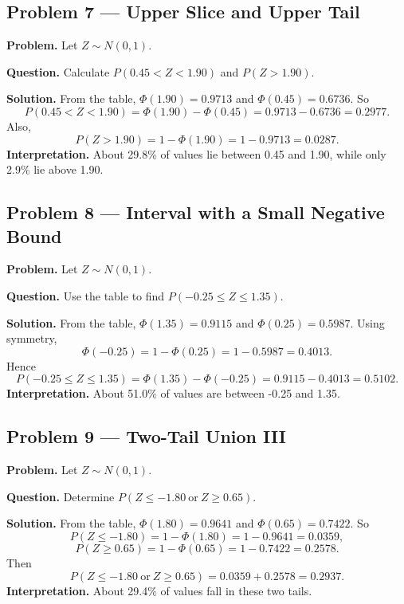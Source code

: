 \begin{ExamProblems}

\item
\subsection*{Problem 7 --- Upper Slice and Upper Tail}

\textbf{Problem.}
Let \(Z\sim N(0,1)\).

\textbf{Question.} Calculate \(P(0.45<Z<1.90)\) and \(P(Z>1.90)\).

\textbf{Solution.}
From the table, \(\Phi(1.90)=0.9713\) and \(\Phi(0.45)=0.6736\).
So
\[
P(0.45<Z<1.90)=\Phi(1.90)-\Phi(0.45)=0.9713-0.6736=0.2977.
\]
Also,
\[
P(Z>1.90)=1-\Phi(1.90)=1-0.9713=0.0287.
\]
\textbf{Interpretation.} About 29.8\% of values lie between 0.45 and 1.90, while only 2.9\% lie above 1.90.


\item
\subsection*{Problem 8 --- Interval with a Small Negative Bound}

\textbf{Problem.}
Let \(Z\sim N(0,1)\).

\textbf{Question.} Use the table to find \(P(-0.25\le Z\le 1.35)\).

\textbf{Solution.}
From the table, \(\Phi(1.35)=0.9115\) and \(\Phi(0.25)=0.5987\).
Using symmetry,
\[
\Phi(-0.25)=1-\Phi(0.25)=1-0.5987=0.4013.
\]
Hence
\[
P(-0.25\le Z\le 1.35)=\Phi(1.35)-\Phi(-0.25)=0.9115-0.4013=0.5102.
\]
\textbf{Interpretation.} About 51.0\% of values are between -0.25 and 1.35.


\item
\subsection*{Problem 9 --- Two-Tail Union III}

\textbf{Problem.}
Let \(Z\sim N(0,1)\).

\textbf{Question.} Determine \(P(Z\le -1.80\ \text{or}\ Z\ge 0.65)\).

\textbf{Solution.}
From the table, \(\Phi(1.80)=0.9641\) and \(\Phi(0.65)=0.7422\).
So
\[
P(Z\le -1.80)=1-\Phi(1.80)=1-0.9641=0.0359,
\]
\[
P(Z\ge 0.65)=1-\Phi(0.65)=1-0.7422=0.2578.
\]
Then
\[
P(Z\le -1.80\ \text{or}\ Z\ge 0.65)=0.0359+0.2578=0.2937.
\]
\textbf{Interpretation.} About 29.4\% of values fall in these two tails.


\end{ExamProblems}
